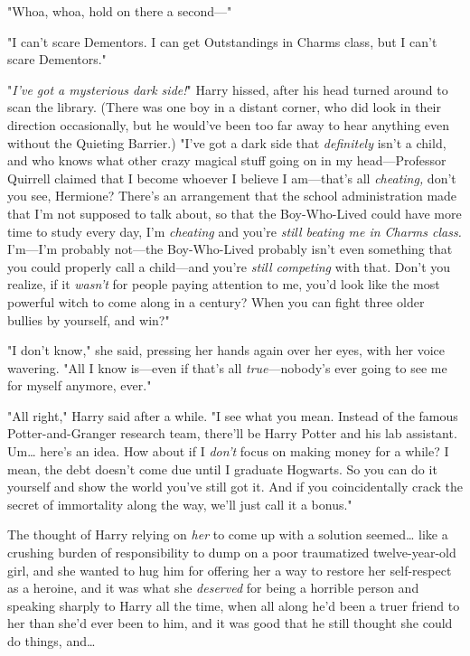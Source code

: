 "Whoa, whoa, hold on there a second---"

"I can't scare Dementors. I can get Outstandings in Charms class, but I can't 
scare Dementors."

"\emph{I've got a mysterious dark side!}" Harry hissed, after his head turned 
around to scan the library. (There was one boy in a distant corner, who did 
look in their direction occasionally, but he would've been too far away to hear 
anything even without the Quieting Barrier.) "I've got a dark side that 
\emph{definitely} isn't a child, and who knows what other crazy magical stuff 
going on in my head---Professor Quirrell claimed that I become whoever I 
believe I am---that's all \emph{cheating,} don't you see, Hermione? There's an 
arrangement that the school administration made that I'm not supposed to talk 
about, so that the Boy-Who-Lived could have more time to study every day, I'm 
\emph{cheating} and you're \emph{still beating me in Charms class.} I'm---I'm 
probably not---the Boy-Who-Lived probably isn't even something that you could 
properly call a child---and you're \emph{still competing} with that. Don't you 
realize, if it \emph{wasn't} for people paying attention to me, you'd look like 
the most powerful witch to come along in a century? When you can fight three 
older bullies by yourself, and win?"

"I don't know," she said, pressing her hands again over her eyes, with her 
voice wavering. "All I know is---even if that's all \emph{true}---nobody's ever 
going to see me for myself anymore, ever."

"All right," Harry said after a while. "I see what you mean. Instead of the 
famous Potter-and-Granger research team, there'll be Harry Potter and his lab 
assistant. Um{\ldots} here's an idea. How about if I \emph{don't} focus on 
making money for a while? I mean, the debt doesn't come due until I graduate 
Hogwarts. So you can do it yourself and show the world you've still got it. And 
if you coincidentally crack the secret of immortality along the way, we'll just 
call it a bonus."

The thought of Harry relying on \emph{her} to come up with a solution 
seemed{\ldots} like a crushing burden of responsibility to dump on a poor 
traumatized twelve-year-old girl, and she wanted to hug him for offering her a 
way to restore her self-respect as a heroine, and it was what she 
\emph{deserved} for being a horrible person and speaking sharply to Harry all 
the time, when all along he'd been a truer friend to her than she'd ever been 
to him, and it was good that he still thought she could do things, and{\ldots}

